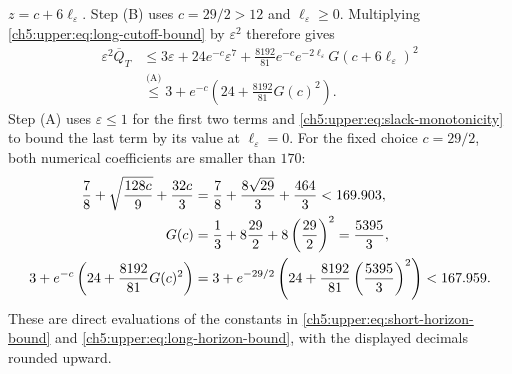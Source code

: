 $z=c+6\ell_\varepsilon$. Step (B) uses $c=29/2>12$ and
$\ell_\varepsilon\ge0$. Multiplying
\eqref{ch5:upper:eq:long-cutoff-bound} by $\varepsilon^2$
therefore gives
\begin{equation}
\begin{aligned}
\varepsilon^2\overline Q_T
 &\le3\varepsilon+24e^{-c}\varepsilon^7
 +\frac{8192}{81}e^{-c}e^{-2\ell_\varepsilon}
   G(c+6\ell_\varepsilon)^2\\
 &\overset{\text{(A)}}{\le}3+e^{-c}
   \left(24+\frac{8192}{81}G(c)^2\right).
\end{aligned}
 \label{ch5:upper:eq:long-horizon-bound}
\end{equation}
Step (A) uses $\varepsilon\le1$ for the first two terms and
\eqref{ch5:upper:eq:slack-monotonicity} to bound the last term by its
value at $\ell_\varepsilon=0$.
For the fixed choice $c=29/2$, both numerical coefficients are smaller
than $170$:
\begin{align}
\frac78+\sqrt{\frac{128c}{9}}+\frac{32c}{3}
 &=\frac78+\frac{8\sqrt{29}}3+\frac{464}3<169.903,
\label{ch5:upper:eq:short-numerical-constant}\\
G(c)&=\frac13+8\frac{29}{2}
               +8\left(\frac{29}{2}\right)^2
             =\frac{5395}{3},\notag\\
3+e^{-c}\left(24+\frac{8192}{81}G(c)^2\right)
 &=3+e^{-29/2}
   \left(24+\frac{8192}{81}\left(\frac{5395}{3}\right)^2\right)
<167.959.
\label{ch5:upper:eq:long-numerical-constant}
\end{align}
These are direct evaluations of the constants in
\eqref{ch5:upper:eq:short-horizon-bound} and
\eqref{ch5:upper:eq:long-horizon-bound}, with the displayed decimals
rounded upward.
\endgroup

